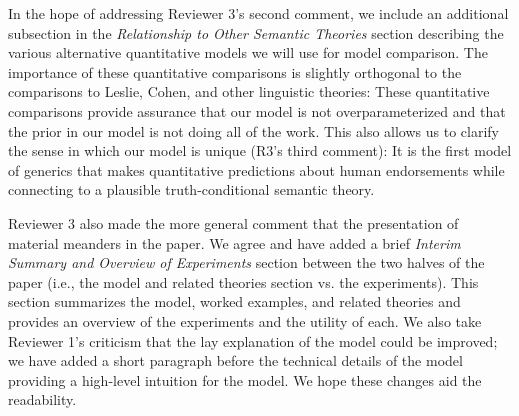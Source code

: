 \documentclass[11pt,letterpaper]{letter} %
\begin{document}
\begin{letter}
In the hope of addressing Reviewer 3's second comment, we include an additional subsection in the \emph{Relationship to Other Semantic Theories} section describing the various alternative quantitative models we will use for model comparison. 
The importance of these quantitative comparisons is slightly orthogonal to the comparisons to Leslie, Cohen, and other linguistic theories: These quantitative comparisons provide assurance that our model is not overparameterized and that the prior in our model is not doing all of the work. 
This also allows us to clarify the sense in which our model is unique (R3's third comment): It is the first model of generics that makes quantitative predictions about human endorsements while connecting to a plausible truth-conditional semantic theory.

Reviewer 3 also made the more general comment that the presentation of material meanders in the paper. 
We agree and have added a brief \emph{Interim Summary and Overview of Experiments} section between the two halves of the paper (i.e., the model and related theories section vs. the experiments). 
This section summarizes the model, worked examples, and related theories and provides an overview of the experiments and the utility of each.
We also take Reviewer 1's criticism that the lay explanation of the model could be improved; we have added a short paragraph before the technical details of the model providing a high-level intuition for the model.
We hope these changes aid the readability.


\end{letter}
\end{document}
